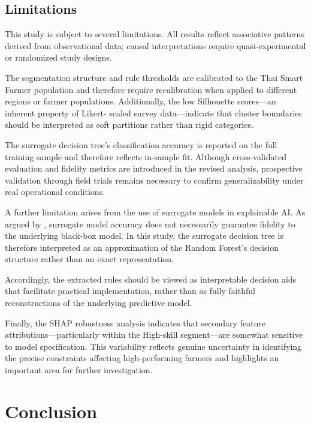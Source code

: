 \documentclass[3p,twocolumn,authoryear]{elsarticle}
\begin{document}
\subsection{Limitations}

This study is subject to several limitations.
All results reflect associative patterns derived from observational
data; causal interpretations require quasi-experimental or randomized
study designs.

The segmentation structure and rule thresholds are calibrated to the
Thai Smart Farmer population and therefore require recalibration when
applied to different regions or farmer populations.
Additionally, the low Silhouette scores—an inherent property of Likert-
scaled survey data—indicate that cluster boundaries should be interpreted
as soft partitions rather than rigid categories.

The surrogate decision tree's classification accuracy is reported on the
full training sample and therefore reflects in-sample fit.
Although cross-validated evaluation and fidelity metrics are introduced
in the revised analysis, prospective validation through field trials
remains necessary to confirm generalizability under real operational
conditions.

A further limitation arises from the use of surrogate models in
explainable AI.
As argued by \citet{rudin2019}, surrogate model accuracy does not
necessarily guarantee fidelity to the underlying black-box model.
In this study, the surrogate decision tree is therefore interpreted as
an approximation of the Random Forest's decision structure rather than
an exact representation.

Accordingly, the extracted rules should be viewed as interpretable
decision aids that facilitate practical implementation, rather than as
fully faithful reconstructions of the underlying predictive model.

Finally, the SHAP robustness analysis indicates that secondary feature
attributions—particularly within the High-skill segment—are somewhat
sensitive to model specification.
This variability reflects genuine uncertainty in identifying the precise
constraints affecting high-performing farmers and highlights an
important area for further investigation.

\section{Conclusion}
\end{document}

